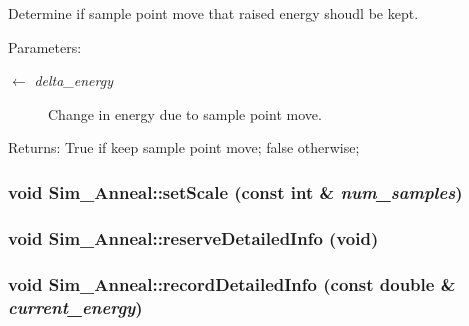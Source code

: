 Determine if sample point move that raised energy shoudl be kept. \begin{Desc}
\item[Parameters:]
\begin{description}
\item[\mbox{$\leftarrow$} {\em delta\_\-energy}]Change in energy due to sample point move. \end{description}
\end{Desc}
\begin{Desc}
\item[Returns:]True if keep sample point move; false otherwise; \end{Desc}
\hypertarget{classSim__Anneal_e099bb1d6024d20d12cac05597e5b02a}{
\subsubsection[setScale]{\setlength{\rightskip}{0pt plus 5cm}void Sim\_\-Anneal::setScale (const int \& {\em num\_\-samples})}}
\label{classSim__Anneal_e099bb1d6024d20d12cac05597e5b02a}


\hypertarget{classSim__Anneal_8fefd06ac45d893bbc9b8e01c0d0fdf3}{
\subsubsection[reserveDetailedInfo]{\setlength{\rightskip}{0pt plus 5cm}void Sim\_\-Anneal::reserveDetailedInfo (void)}}
\label{classSim__Anneal_8fefd06ac45d893bbc9b8e01c0d0fdf3}


\hypertarget{classSim__Anneal_c0ed4758fe537d303240359100d7e881}{
\subsubsection[recordDetailedInfo]{\setlength{\rightskip}{0pt plus 5cm}void Sim\_\-Anneal::recordDetailedInfo (const double \& {\em current\_\-energy})}}
\label{classSim__Anneal_c0ed4758fe537d303240359100d7e881}


